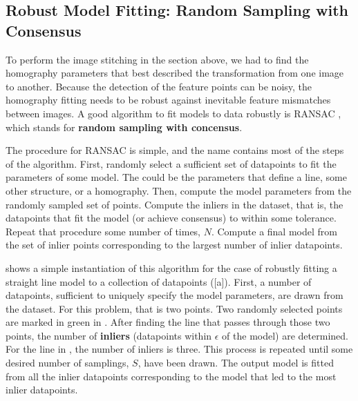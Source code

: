 \subsection{Robust Model Fitting: Random Sampling with Consensus}
\label{sec:RANSAC}

To perform the image stitching in the section above, we had to find the homography parameters that best described the transformation from one image to another. Because the detection of the feature points can be noisy, the homography fitting needs to be robust against inevitable feature mismatches between images.  A good algorithm to fit models to data robustly is  RANSAC \cite{Fischler1981}, which stands for {\bf random sampling with concensus}.  

The procedure for RANSAC is simple, and the name contains most of the steps of the algorithm.  First, randomly select a sufficient set of datapoints to fit the parameters of some model.  The could be the parameters that define a line, some other structure, or a homography.  Then, compute the model parameters from the randomly sampled set of points. Compute the inliers in the dataset, that is, the datapoints that fit the model (or achieve consensus) to within some tolerance.  Repeat that procedure some number of times, $N$.    Compute a final model from the set of inlier points corresponding to the largest number of inlier datapoints.

\Fig{\ref{fig:ransac}} shows a simple instantiation of this algorithm for the case of robustly fitting a straight line model to a collection of datapoints (\fig{\ref{fig:ransac}}[a]).  First, a number of datapoints, sufficient to uniquely specify the model parameters, are drawn from the dataset.  For this problem, that is two points.  Two randomly selected points are marked in green in .  After finding the line that passes through those two points, the number of {\bf inliers} (datapoints within $\epsilon$ of the model) are determined.  For the line in , the number of inliers is three. This process is repeated until some desired number of samplings, $S$, have been drawn.  The output model is fitted from all the inlier datapoints corresponding to the model that led to the most inlier datapoints.

